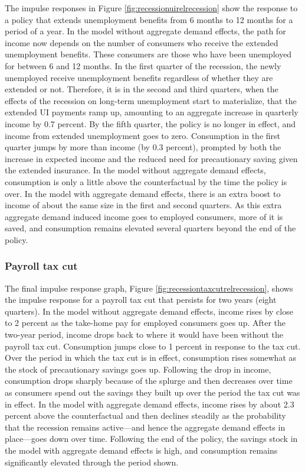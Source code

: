 \documentclass[../HAFiscal]{subfiles}
\begin{document}
The impulse responses in Figure \ref{fig:recessionuirelrecession} show the response to a policy that extends unemployment benefits from 6 months to 12 months for a period of a year.
In the model without aggregate demand effects, the path for income now depends on the number of consumers who receive the extended unemployment benefits.
These consumers are those who have been unemployed for between 6 and 12 months.
In the first quarter of the recession, the newly unemployed receive unemployment benefits regardless of whether they are extended or not.
Therefore, it is in the second and third quarters, when the effects of the recession on long-term unemployment start to materialize, that the extended UI payments ramp up, amounting to an aggregate increase in quarterly income by 0.7 percent.
By the fifth quarter, the policy is no longer in effect, and income from extended unemployment goes to zero.
Consumption in the first quarter jumps by more than income (by 0.3 percent), prompted by both the increase in expected income and the reduced need for precautionary saving given the extended insurance.
In the model without aggregate demand effects, consumption is only a little above the counterfactual by the time the policy is over.
In the model with aggregate demand effects, there is an extra boost to income of about the same size in the first and second quarters.
As this extra aggregate demand induced income goes to employed consumers, more of it is saved, and consumption remains elevated several quarters beyond the end of the policy.

\subsubsection{Payroll tax cut}

The final impulse response graph, Figure \ref{fig:recessiontaxcutrelrecession}, shows the impulse response for a payroll tax cut that persists for two years (eight quarters).
In the model without aggregate demand effects, income rises by close to 2 percent as the take-home pay for employed consumers goes up.
After the two-year period, income drops back to where it would have been without the payroll tax cut.
Consumption jumps close to 1 percent in response to the tax cut.
Over the period in which the tax cut is in effect, consumption rises somewhat as the stock of precautionary savings goes up.
Following the drop in income, consumption drops sharply because of the splurge and then decreases over time as consumers spend out the savings they built up over the period the tax cut was in effect.
In the model with aggregate demand effects, income rises by about 2.3 percent above the counterfactual and then declines steadily as the probability that the recession remains active---and hence the aggregate demand effects in place---goes down over time.
Following the end of the policy, the savings stock in the model with aggregate demand effects is high, and consumption remains significantly elevated through the period shown.
\end{document}
